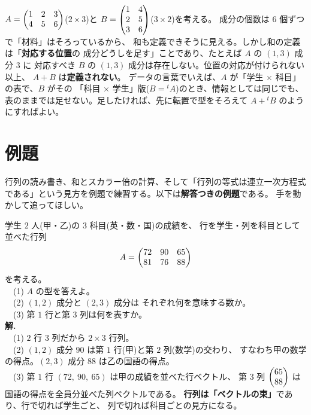 \begin{hanrei}[型が違う行列は足せない]\label{hanrei:mat-add}
$A = \begin{pmatrix}1 & 2 & 3 \\ 4 & 5 & 6\end{pmatrix}$($2 \times 3$)と
$B = \begin{pmatrix}1 & 4 \\ 2 & 5 \\ 3 & 6\end{pmatrix}$($3 \times 2$)を考える。
成分の個数は $6$ 個ずつで「材料」はそろっているから、
和も定義できそうに見える。しかし和の定義は「\textbf{対応する位置}の
成分どうしを足す」ことであり、たとえば $A$ の $(1,3)$ 成分 $3$ に
対応すべき $B$ の $(1,3)$ 成分は存在しない。位置の対応が付けられない以上、
$A + B$ は\textbf{定義されない}。
データの言葉でいえば、$A$ が「学生 $\times$ 科目」の表で、$B$ がその
「科目 $\times$ 学生」版($B = {}^t\!A$)のとき、情報としては同じでも、
表のままでは足せない。足したければ、先に転置で型をそろえて
$A + {}^t\!B$ のようにすればよい。
\end{hanrei}

\section{例題}

行列の読み書き、和とスカラー倍の計算、そして「行列の等式は連立一次方程式
である」という見方を例題で練習する。以下は\textbf{解答つきの例題}である。
手を動かして追ってほしい。

\begin{rei}[例題・基本(表の読み取り)]
学生 $2$ 人(甲・乙)の $3$ 科目(英・数・国)の成績を、
行を学生・列を科目として並べた行列
\[
A = \begin{pmatrix}72 & 90 & 65 \\ 81 & 76 & 88\end{pmatrix}
\]
を考える。\\
　(1) $A$ の型を答えよ。\\
　(2) $(1,2)$ 成分と $(2,3)$ 成分は
それぞれ何を意味する数か。\\
　(3) 第 $1$ 行と第 $3$ 列は何を表すか。\\
\textbf{解.}\\
　(1) $2$ 行 $3$ 列だから $2 \times 3$ 行列。\\
　(2) $(1,2)$ 成分 $90$ は第 $1$ 行(甲)と第 $2$ 列(数学)の交わり、
すなわち甲の数学の得点。$(2,3)$ 成分 $88$ は乙の国語の得点。\\
　(3) 第 $1$ 行 $(72,\ 90,\ 65)$ は甲の成績を並べた行ベクトル、
第 $3$ 列 $\begin{pmatrix}65 \\ 88\end{pmatrix}$ は国語の得点を全員分並べた列ベクトルである。
\textbf{行列は「ベクトルの束」}であり、行で切れば学生ごと、
列で切れば科目ごとの見方になる。
\end{rei}

